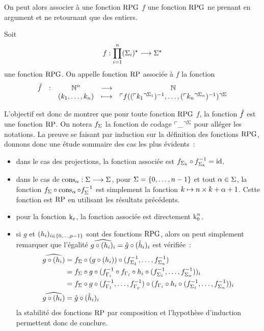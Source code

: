 On peut alors associer à une fonction $\operatorname{RPG}$ $f$ une fonction $\operatorname{RPG}$ ne prenant
en argument et ne retournant que des entiers.

\begin{definition}\label{def.RP.RPG}
  Soit
  \[f : \displaystyle \prod_{i = 1}^n(\Sigma_{i})^{\star} \longrightarrow \Sigma^{\star}\]
  une fonction $\operatorname{RPG}$. On appelle fonction $\operatorname{RP}$ associée à $f$ la fonction
  \[\makeFun{\relev{f}}{\bN^n}{\bN}{(k_1,\ldots,k_n)}
            {\codRPG{f((\codRPG{k_1}{\ABA_1})^{-1},\ldots,
                (\codRPG{k_n}{\ABA_n})^{-1})}{\ABA}}\]
\end{definition}

L'objectif est donc de montrer que pour toute fonction $\operatorname{RPG}$ $f$, la fonction
$\hat{f}$ est une fonction $\operatorname{RP}$. On notera $f_\Sigma$ la fonction de codage
$\ulcorner\mathord{\_}\urcorner^{\Sigma}$ pour alléger les notations. La preuve se faisant par
induction sur la définition des fonctions $\operatorname{RPG}$, donnons donc une étude
sommaire des cas les plus évidents~:
\begin{itemize}
\item dans le cas des projections, la fonction associée est
  $f_{\Sigma_k}\circ f^{-1}_{\Sigma_k} = \operatorname{id}$.
\item dans le cas de $\operatorname{cons}_{\alpha} : \displaystyle \Sigma \longrightarrow \Sigma$, pour
  $\Sigma = \{0,\ldots,n - 1\}$ et tout $\alpha \in \Sigma$, la fonction
  $f_\Sigma\circ \operatorname{cons}_{\alpha}\circ f_\Sigma^{-1}$ est simplement la fonction
  $k \mapsto n\times k + \alpha + 1$. Cette fonction est $\operatorname{RP}$ en utilisant
  les résultats précédents.
\item pour la fonction $\operatorname{k}_{\varepsilon}$, la fonction associée est directement $\operatorname{k}_{0}^{n}$.
\item si $g$ et $(h_i)_{i \in \{0,\ldots,p - 1\}}$ sont des fonctions $\operatorname{RPG}$, alors on
  peut simplement remarquer que l'égalité
  $\widehat{g\circ (h_i)_i} = \hat{g} \circ (\hat{h}_i)_i$
  est vérifiée~:
  \begin{align*}
    \widehat{g\circ (h_i)} &= f_\Sigma\circ (g \circ (h_i)) \circ
    (f_{\Sigma_1}^{-1},\ldots,f_{\Sigma_n}^{-1})\\
    &= f_\Sigma\circ g \circ (f_{\Gamma_i}^{-1}\circ f_{\Gamma_i}\circ h_i\circ
    (f_{\Sigma_1}^{-1},\ldots,f_{\Sigma_n}^{-1}))_i\\
    &= f_\Sigma\circ g \circ (f_{\Gamma_1}^{-1},\ldots,f_{\Gamma_p}^{-1})
    \circ (f_{\Gamma_i}\circ h_i\circ
    (f_{\Sigma_1}^{-1},\ldots,f_{\Sigma_n}^{-1}))_i\\
    \widehat{g\circ (h_i)} &= \hat{g} \circ (\hat{h}_i)_i
  \end{align*}
  la stabilité des fonctions $\operatorname{RP}$ par composition et l'hypothèse d'induction
  permettent donc de conclure.
\end{itemize}


